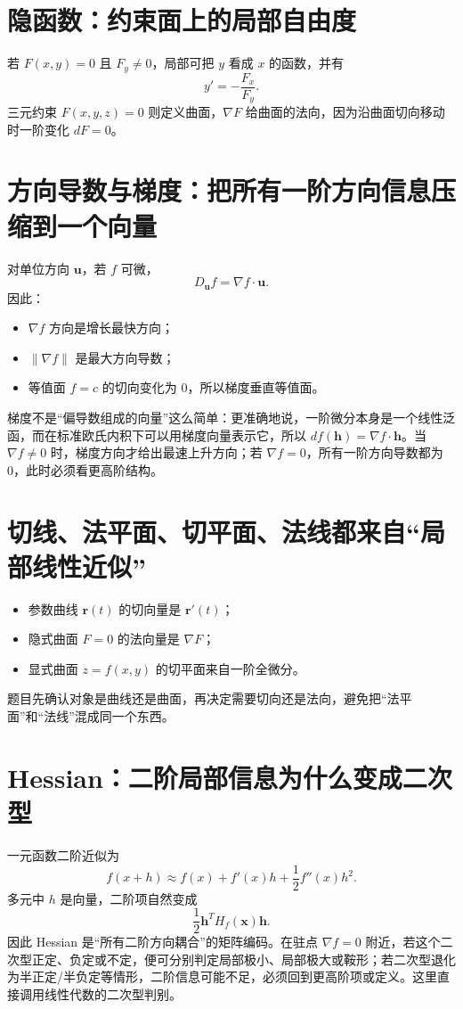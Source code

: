 \documentclass[11pt,a4paper,openany]{ctexbook}
\begin{document}
\section{隐函数：约束面上的局部自由度}
若 $F(x,y)=0$ 且 $F_y\neq0$，局部可把 $y$ 看成 $x$ 的函数，并有
\[
y'=-\frac{F_x}{F_y}.
\]
三元约束 $F(x,y,z)=0$ 则定义曲面，$\nabla F$ 给曲面的法向，因为沿曲面切向移动时一阶变化 $dF=0$。

\section{方向导数与梯度：把所有一阶方向信息压缩到一个向量}
对单位方向 $\bm u$，若 $f$ 可微，
\[
D_{\bm u}f=\nabla f\cdot\bm u.
\]
因此：
\begin{itemize}
  \item $\nabla f$ 方向是增长最快方向；
  \item $\lVert\nabla f\rVert$ 是最大方向导数；
  \item 等值面 $f=c$ 的切向变化为 0，所以梯度垂直等值面。
\end{itemize}
梯度不是“偏导数组成的向量”这么简单：更准确地说，一阶微分本身是一个线性泛函，而在标准欧氏内积下可以用梯度向量表示它，所以 $df(\bm h)=\nabla f\cdot\bm h$。当 $\nabla f\neq0$ 时，梯度方向才给出最速上升方向；若 $\nabla f=0$，所有一阶方向导数都为 0，此时必须看更高阶结构。

\section{切线、法平面、切平面、法线都来自“局部线性近似”}
\begin{itemize}
  \item 参数曲线 $\bm r(t)$ 的切向量是 $\bm r'(t)$；
  \item 隐式曲面 $F=0$ 的法向量是 $\nabla F$；
  \item 显式曲面 $z=f(x,y)$ 的切平面来自一阶全微分。
\end{itemize}
题目先确认对象是曲线还是曲面，再决定需要切向还是法向，避免把“法平面”和“法线”混成同一个东西。

\section{Hessian：二阶局部信息为什么变成二次型}
一元函数二阶近似为
\[
f(x+h)\approx f(x)+f'(x)h+\frac12f''(x)h^2.
\]
多元中 $h$ 是向量，二阶项自然变成
\[
\frac12\bm h^T H_f(\bm x)\bm h.
\]
因此 Hessian 是“所有二阶方向耦合”的矩阵编码。在驻点 $\nabla f=0$ 附近，若这个二次型正定、负定或不定，便可分别判定局部极小、局部极大或鞍形；若二次型退化为半正定/半负定等情形，二阶信息可能不足，必须回到更高阶项或定义。这里直接调用线性代数的二次型判别。
\end{document}
